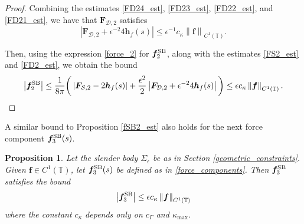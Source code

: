 \documentclass[11pt]{article}
\numberwithin{equation}{section}
\newcommand{\T}{\mathbb{T}}
\newcommand{\SB}{{\rm SB}}
\newcommand{\abs}[1]{\left\lvert #1 \right\rvert}
\newcommand{\norm}[1]{\left\lVert #1 \right\rVert}
\newcommand{\mc}[1]{\mathcal{#1}}
\newtheorem{proposition}[theorem]{Proposition}
\theoremstyle{definition}
\begin{document}
\begin{proof}
Combining the estimates \eqref{FD24_est}, \eqref{FD23_est}, \eqref{FD22_est}, and \eqref{FD21_est}, we have that $\bm{F}_{\mc{D},2}$ satisfies
\begin{equation}\label{FD2_est}
\abs{\bm{F}_{\mc{D},2} +\epsilon^{-2}4\bm{h}_f(s)} \le \epsilon^{-1} c_\kappa \norm{\bm{f}}_{C^1(\T)}.
\end{equation}

Then, using the expression \eqref{force_2} for $\bm{f}^{\SB}_2$, along with the estimates \eqref{FS2_est} and \eqref{FD2_est}, we obtain the bound
\begin{equation}\label{f2sb_est0}
\abs{\bm{f}^{\SB}_2} \le \frac{1}{8\pi}\bigg( \abs{\bm{F}_{\mc{S},2} - 2\bm{h}_f(s)} + \frac{\epsilon^2}{2}\abs{\bm{F}_{\mc{D},2} +\epsilon^{-2}4\bm{h}_f(s)}\bigg) \le \epsilon c_\kappa \norm{\bm{f}}_{C^1(\T)}.
\end{equation}
\end{proof}



A similar bound to Proposition \ref{fSB2_est} also holds for the next force component $\bm{f}^{\SB}_3(s)$. 
\begin{proposition}\label{fSB3_est}
Let the slender body $\Sigma_\epsilon$ be as in Section \ref{geometric_constraints}. Given $\bm{f}\in C^1(\T)$, let $\bm{f}^{\SB}_3(s)$ be defined as in \eqref{force_components}. Then $\bm{f}^{\SB}_3$ satisfies the bound
\begin{equation}
\abs{\bm{f}^{\SB}_3 } \le \epsilon c_\kappa\norm{\bm{f}}_{C^1(\T)}
\end{equation}
where the constant $c_\kappa$ depends only on $c_{\Gamma}$ and $\kappa_{\max}$.
\end{proposition}
\end{document}
